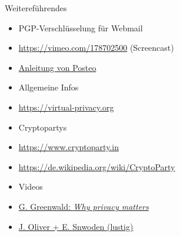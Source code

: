 \documentclass{beamer}
\begin{document}

\begin{frame}{Weitereführendes}

\begin{itemize}
\item[] \hspace{-2em} PGP-Verschlüsselung für Webmail
  \item \url{https://vimeo.com/178702500} (Screencast)\\[2mm]
  \item \href{https://posteo.de/hilfe/wie-installiere-ich-eine-ende-zu-ende-verschluesselung-pgp-im-browser}{Anleitung von Posteo}
  \item[] \hspace{-2em} Allgemeine Infos
  \item \url{https://virtual-privacy.org}
  \item[] \hspace{-2em} Cryptopartys
  \item \url{https://www.cryptoparty.in}
  \item \url{https://de.wikipedia.org/wiki/CryptoParty}
  \item[] \hspace{-2em} Videos
  \item \href{https://www.ted.com/talks/glenn_greenwald_why_privacy_matters}{G. Greenwald: \textit{Why privacy matters}}
  \item \href{https://www.youtube.com/watch?v=XEVlyP4_11M}{J. Oliver + E. Snwoden (lustig)}
\end{itemize}
\end{frame}
\end{document}
